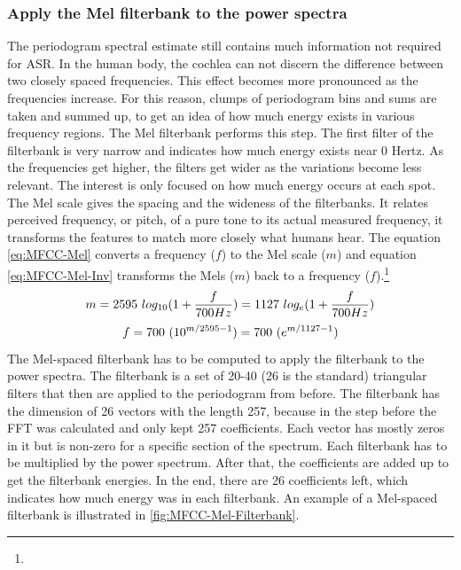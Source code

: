 \subsubsection{Apply the Mel filterbank to the power spectra}
The periodogram spectral estimate still contains much information not required for \gls{ASR}. In the human body, the cochlea can not discern the difference between two closely spaced frequencies. This effect becomes more pronounced as the frequencies increase. For this reason, clumps of periodogram bins and sums are taken and summed up, to get an idea of how much energy exists in various frequency regions.
\newline
\newline
The Mel filterbank performs this step. The first filter of the filterbank is very narrow and indicates how much energy exists near 0 Hertz. As the frequencies get higher, the filters get wider as the variations become less relevant. The interest is only focused on how much energy occurs at each spot. The Mel scale gives the spacing and the wideness of the filterbanks. It relates perceived frequency, or pitch, of a pure tone to its actual measured frequency, it transforms the features to match more closely what humans hear. The equation \ref{eq:MFCC-Mel} converts a frequency ($f$) to the Mel scale ($m$) and equation \ref{eq:MFCC-Mel-Inv} transforms the Mels ($m$) back to a frequency ($f$).\footnote{}
\begin{equation}
    \centering
    m = 2595 \ log_{10}(1 + \frac{f}{700Hz}) = 1127 \ log_e(1 + \frac{f}{700Hz})
    \label{eq:MFCC-Mel}
\end{equation}
\begin{equation}
    \centering
    f = 700 \ (10^{m/2595-1}) = 700 \ (e^{m/1127-1})
    \label{eq:MFCC-Mel-Inv}
\end{equation}
The Mel-spaced filterbank has to be computed to apply the filterbank to the power spectra. The filterbank is a set of 20-40 (26 is the standard) triangular filters that then are applied to the periodogram from before. The filterbank has the dimension of 26 vectors with the length 257, because in the step before the \gls{FFT} was calculated and only kept 257 coefficients. Each vector has mostly zeros in it but is non-zero for a specific section of the spectrum. Each filterbank has to be multiplied by the power spectrum. After that, the coefficients are added up to get the filterbank energies. In the end, there are 26 coefficients left, which indicates how much energy was in each filterbank. An example of a Mel-spaced filterbank is illustrated in \ref{fig:MFCC-Mel-Filterbank}.
